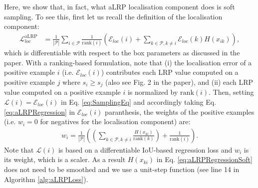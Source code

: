 \documentclass{article}
\begin{document}
Here, we show that, in fact, what aLRP localisation component does is soft sampling. To see this, first let us recall the definition of the localisation component: 
\begin{align}
    \label{eq:aLRPRegression}
     \mathcal{L}^{\mathrm{aLRP}}_{loc} &= \frac{1}{|\mathcal{P}|}\sum \limits_{i \in \mathcal{P}} \frac{1}{\mathrm{rank}(i) }\left( \mathcal{E}_{loc}(i)+\sum \limits_{k \in \mathcal{P}, k \neq i}  \mathcal{E}_{loc}(k) H(x_{ik})  \right),
\end{align}
which is differentiable with respect to the box parameters as discussed in the paper. With a ranking-based formulation, note that (i) the localisation error of a positive example $i$ (i.e. $\mathcal{E}_{loc}(i)$) contributes each LRP value computed on a positive example $j$ where $s_i \geq s_j$ (also see Fig. 2 in the paper), and (ii) each LRP value computed on a positive example $i$ is normalized by $\mathrm{rank}(i)$. Then, setting $\mathcal{L}(i) = \mathcal{E}_{loc}(i)$ in Eq. \ref{eq:SamplingEq} and accordingly taking Eq. \ref{eq:aLRPRegression} in $\mathcal{E}_{loc}(i)$ paranthesis, the weights of the positive examples (i.e. $w_i =0$ for negatives for the localisation component) are:
\begin{align}
    \label{eq:aLRPRegressionSoft}
    w_i = \frac{1}{|\mathcal{P}|} \left( \left( {\sum \limits_{k \in \mathcal{P}, k \neq i}}  \frac{H(x_{ki})}{\mathrm{rank}(k)}\right) + \frac{1}{\mathrm{rank}(i)} \right).
\end{align}
Note that $\mathcal{L}(i)$ is based on a differentiable IoU-based regression loss and $w_i$ is its weight, which is a scaler. As a result $H(x_{ki})$ in Eq. \ref{eq:aLRPRegressionSoft} does not need to be smoothed and we use a unit-step function (see line 14 in Algorithm \ref{alg:aLRPLoss}).
\end{document}
